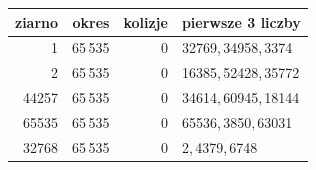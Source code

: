 \begin{tabular}{rrrl}\toprule
ziarno & okres & kolizje & pierwsze 3 liczby \\ \midrule
1 & 65\,535 & 0 & 32769,\,34958,\,3374 \\
2 & 65\,535 & 0 & 16385,\,52428,\,35772 \\
44257 & 65\,535 & 0 & 34614,\,60945,\,18144 \\
65535 & 65\,535 & 0 & 65536,\,3850,\,63031 \\
32768 & 65\,535 & 0 & 2,\,4379,\,6748 \\
\bottomrule\end{tabular}
